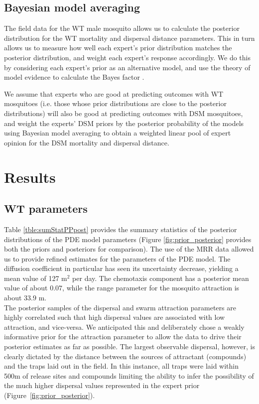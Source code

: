 \documentclass[]{bmcart}
\begin{document}
\subsection{Bayesian model averaging}
The field data for the WT male mosquito allows us to calculate the posterior distribution for the WT mortality and dispersal distance parameters. This in turn allows us to measure how well each expert's prior distribution matches the posterior distribution, and weight each expert's response accordingly. We do this by considering each expert's prior as an alternative model, and use the theory of model evidence \cite{robert2001bayesian} to calculate the Bayes factor \citep{Kass1995b, Hosack2020}. 

We assume that experts who are good at predicting outcomes with WT mosquitoes (i.e. those whose prior distributions are close to the posterior distributions) will also be good at predicting outcomes with DSM mosquitoes, and weight the experts' DSM priors by the posterior probability of the models using Bayesian model averaging to obtain a weighted linear pool of expert opinion for the DSM mortality and dispersal distance.

\section{Results}
\subsection{WT parameters}
Table \ref{tble:sumStatPPpost} provides the summary statistics of the posterior distributions of the PDE model parameters (Figure \ref{fig:prior_posterior} provides both the priors and posteriors for comparison). The use of the MRR data allowed us to provide refined estimates for the parameters of the PDE model. The diffusion coefficient in particular has seen its uncertainty decrease, yielding a mean value of 127 m$^2$ per day. The chemotaxis component has a posterior mean value of about $0.07$, while the range parameter for the mosquito attraction is about $33.9$ m.\\

The posterior samples of the dispersal and swarm attraction parameters are highly correlated such that high dispersal values are associated with low attraction, and vice-versa. We anticipated this and deliberately chose a weakly informative prior for the attraction parameter to allow the data to drive their posterior estimates as far as possible. The largest observable dispersal, however, is clearly dictated by the distance between the sources of attractant (compounds) and the traps laid out in the field. In this instance, all traps were laid within 500m of release sites and compounds \citep[Figure 1]{Epopa2017} limiting the ability to infer the possibility of the much higher dispersal values represented in the expert prior (Figure~\ref{fig:prior_posterior}).
\end{document}

